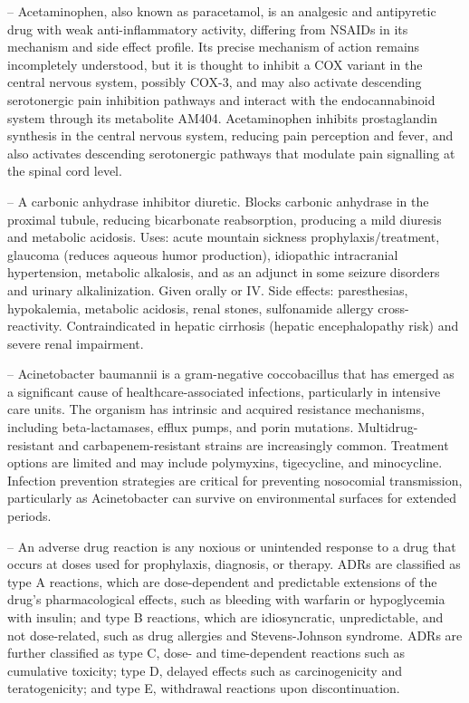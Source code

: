 -- Acetaminophen, also known as paracetamol, is an analgesic and antipyretic drug with weak anti-inflammatory activity, differing from NSAIDs in its mechanism and side effect profile. Its precise mechanism of action remains incompletely understood, but it is thought to inhibit a COX variant in the central nervous system, possibly COX-3, and may also activate descending serotonergic pain inhibition pathways and interact with the endocannabinoid system through its metabolite AM404. Acetaminophen inhibits prostaglandin synthesis in the central nervous system, reducing pain perception and fever, and also activates descending serotonergic pathways that modulate pain signalling at the spinal cord level.

-- A carbonic anhydrase inhibitor diuretic. Blocks carbonic anhydrase in the proximal tubule, reducing bicarbonate reabsorption, producing a mild diuresis and metabolic acidosis. Uses: acute mountain sickness prophylaxis/treatment, glaucoma (reduces aqueous humor production), idiopathic intracranial hypertension, metabolic alkalosis, and as an adjunct in some seizure disorders and urinary alkalinization. Given orally or IV. Side effects: paresthesias, hypokalemia, metabolic acidosis, renal stones, sulfonamide allergy cross-reactivity. Contraindicated in hepatic cirrhosis (hepatic encephalopathy risk) and severe renal impairment.

-- Acinetobacter baumannii is a gram-negative coccobacillus that has emerged as a significant cause of healthcare-associated infections, particularly in intensive care units. The organism has intrinsic and acquired resistance mechanisms, including beta-lactamases, efflux pumps, and porin mutations. Multidrug-resistant and carbapenem-resistant strains are increasingly common. Treatment options are limited and may include polymyxins, tigecycline, and minocycline. Infection prevention strategies are critical for preventing nosocomial transmission, particularly as Acinetobacter can survive on environmental surfaces for extended periods.

-- An adverse drug reaction is any noxious or unintended response to a drug that occurs at doses used for prophylaxis, diagnosis, or therapy. ADRs are classified as type A reactions, which are dose-dependent and predictable extensions of the drug's pharmacological effects, such as bleeding with warfarin or hypoglycemia with insulin; and type B reactions, which are idiosyncratic, unpredictable, and not dose-related, such as drug allergies and Stevens-Johnson syndrome. ADRs are further classified as type C, dose- and time-dependent reactions such as cumulative toxicity; type D, delayed effects such as carcinogenicity and teratogenicity; and type E, withdrawal reactions upon discontinuation.

